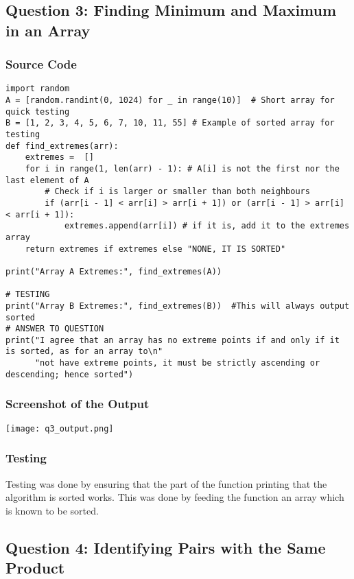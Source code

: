\documentclass{article}
\begin{document}
\subsection*{Question 3: Finding Minimum and Maximum in an Array}
\subsubsection*{Source Code}
\begin{lstlisting}
import random
A = [random.randint(0, 1024) for _ in range(10)]  # Short array for quick testing
B = [1, 2, 3, 4, 5, 6, 7, 10, 11, 55] # Example of sorted array for testing
def find_extremes(arr):
    extremes =  []
    for i in range(1, len(arr) - 1): # A[i] is not the first nor the last element of A
        # Check if i is larger or smaller than both neighbours
        if (arr[i - 1] < arr[i] > arr[i + 1]) or (arr[i - 1] > arr[i] < arr[i + 1]): 
            extremes.append(arr[i]) # if it is, add it to the extremes array
    return extremes if extremes else "NONE, IT IS SORTED"

print("Array A Extremes:", find_extremes(A))

# TESTING
print("Array B Extremes:", find_extremes(B))  #This will always output sorted
# ANSWER TO QUESTION
print("I agree that an array has no extreme points if and only if it is sorted, as for an array to\n"
      "not have extreme points, it must be strictly ascending or descending; hence sorted")
\end{lstlisting}

\subsubsection*{Screenshot of the Output}
\texttt{[image: q3\_output.png]}

\subsubsection*{Testing}
Testing was done by ensuring that the part of the function printing that the algorithm is sorted works. This was done by feeding the function an array which is known to be sorted.

\subsection*{Question 4: Identifying Pairs with the Same Product}
\end{document}
